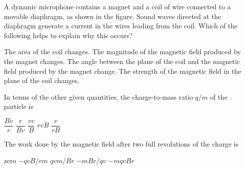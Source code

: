 \documentclass{../../oss-apphys-exam}
\begin{document}
\begin{multicols*}{2}
\begin{questions}
    \question A dynamic microphone contains a magnet and a coil of wire
    connected to a movable diaphragm, as shown in the figure. Sound waves
    directed at the diaphragm generate a current in the wires leading from the
    coil. Which of the following helps to explain why this occurs?
    \begin{choices}
      \choice The area of the coil changes.
      \choice The magnitude of the magnetic field produced by the magnet
      changes.
      \choice The angle between the plane of the coil and the magnetic field
      produced by the magnet change.
      \choice The strength of the magnetic field in the plane of the coil
      changes.
    \end{choices}
    \columnbreak
    

    \question In terms of the other given quantities, the charge-to-mass ratio
    $q/m$ of the particle is
    \begin{choices}
      \choice $\dfrac{Bv}r$
      \choice $\dfrac r{Bv}$
      \choice $\dfrac{rv}B$
      \choice $rvB$
      \choice $\dfrac v{rB}$
    \end{choices}
    \label{q:circ1}
    
    \question The work done by the magnetic field after two full revolutions of
    the charge is
    \begin{choices}
      \choice zero
      \choice $-qvB/rm$
      \choice $qvm/Br$
      \choice $-mBr/qv$
      \choice $-mqvBr$
    \end{choices}
    \label{q:circ2}
    

\end{questions}
\end{multicols*}
\end{document}
